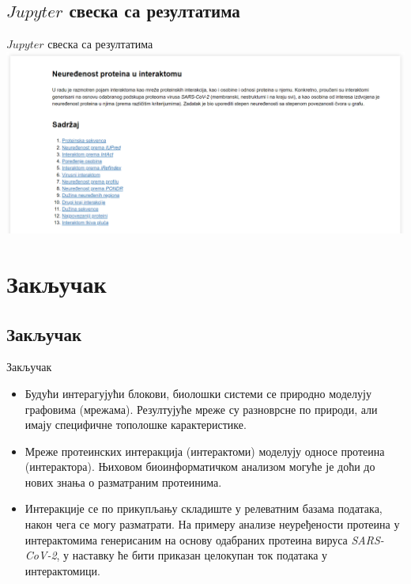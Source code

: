 \documentclass[hyperref={bookmarks=false}]{beamer}
\begin{document}
\subsection{$Jupyter$ свеска са резултатима}
\begin{frame}{$Jupyter$ свеска са резултатима}
\centering\includegraphics[width=\textwidth]{sveska.png}
\end{frame}


\section{Закључак}
\subsection{Закључак}
\begin{frame}{Закључак}
\begin{itemize}
	\item Будући интерагујући блокови, биолошки системи се природно моделују графовима (мрежама). Резултујуће мреже су разноврсне по природи, али имају специфичне тополошке карактеристике.

	\item Мреже протеинских интеракција (интерактоми) моделују односе протеина (интерактора). Њиховом биоинформатичком анализом могуће је доћи до нових знања о разматраним протеинима.

	\item Интеракције се по прикупљању складиште у релеватним базама података, након чега се могу разматрати. На примеру анализе неуређености протеина у интерактомима генерисаним на основу одабраних протеина вируса \textit{SARS-CoV-2}, у наставку ће бити приказан целокупан ток података у интерактомици.
\end{itemize}
\end{frame}
\end{document}
